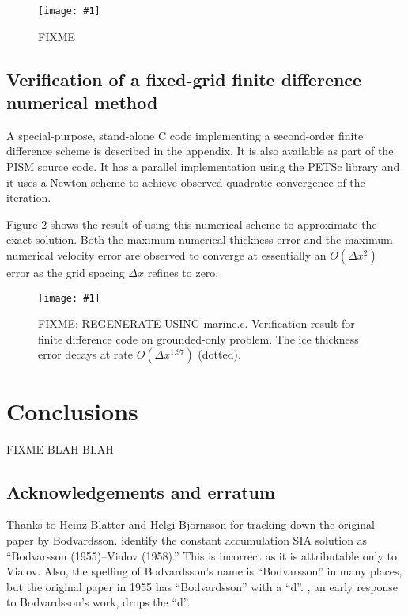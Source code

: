 \documentclass[review,letterpaper]{igs}
\newcommand{\onecol}[1]{\texttt{[image: \#1]}}
\begin{document}
\begin{figure}[ht]
\onecol{exactmarine-stiffness-ratio}
\caption{FIXME} \label{fig:stiffness}
\end{figure}


\subsection*{Verification of a fixed-grid finite difference numerical method}  A special-purpose, stand-alone C code implementing a second-order finite difference scheme is described in the appendix.  It is also available as part of the PISM source code.  It has a parallel implementation using the PETSc \citep{petsc-user-ref} library and it uses a Newton scheme to achieve observed quadratic convergence of the iteration.

Figure \ref{fig:verifNresult} shows the result of using this numerical scheme to approximate the exact solution.  Both the maximum numerical thickness error and the maximum numerical velocity error are observed to converge at essentially an $O(\Delta x^2)$ error as the grid spacing $\Delta x$ refines to zero.  

\begin{figure}[ht]
\onecol{verifN}
\caption{FIXME: REGENERATE USING marine.c.  Verification result for finite difference code on grounded-only problem.  The ice thickness error decays at rate $O(\Delta x^{1.97})$ (dotted).} \label{fig:verifNresult}
\end{figure}


\section{Conclusions}  FIXME BLAH BLAH

\subsection*{Acknowledgements and erratum}  Thanks to Heinz Blatter and Helgi Bj\"ornsson for tracking down the original paper by Bodvardsson.  \cite{BLKCB} identify the constant accumulation SIA solution as ``Bodvarsson (1955)--Vialov (1958).''  This is incorrect as it is attributable only to Vialov.  Also, the spelling of Bodvardsson's name is ``Bodvarsson'' in many places, but the original paper in 1955 has ``Bodvardsson'' with a ``d''.  \cite{Weertman61stability}, an early response to Bodvardsson's work, drops the ``d''.




\end{document}

